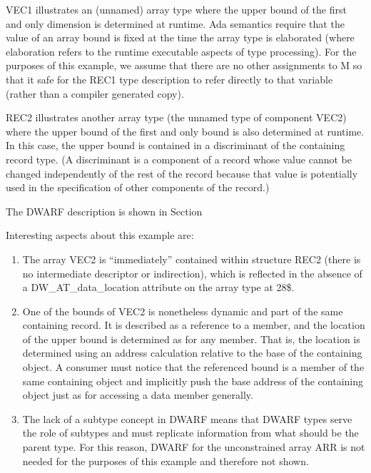 VEC1 illustrates an (unnamed) array type where the upper bound
of the first and only dimension is determined at runtime. Ada
semantics require that the value of an array bound is fixed at
the time the array type is elaborated (where elaboration refers
to the runtime executable aspects of type processing). For
the purposes of this example, we assume that there are no
other assignments to M so that it safe for the REC1 type
description to refer directly to that variable (rather than
a compiler generated copy).

REC2 illustrates another array type (the unnamed type of
component VEC2) where the upper bound of the first and only
bound is also determined at runtime. In this case, the upper
bound is contained in a discriminant of the containing record
type. (A discriminant is a component of a record whose value
cannot be changed independently of the rest of the record
because that value is potentially used in the specification
of other components of the record.)

The DWARF description is shown in 
Section 


Interesting aspects about this example are:

\begin{enumerate}[1)]
\item The array VEC2 is ``immediately'' contained within structure
REC2 (there is no intermediate descriptor or indirection),
which is reflected in the absence of a DW\_AT\_data\_location
attribute on the array type at 28\$.

\item One of the bounds of VEC2 is nonetheless dynamic and part of
the same containing record. It is described as a reference to
a member, and the location of the upper bound is determined
as for any member. That is, the location is determined using
an address calculation relative to the base of the containing
object.  A consumer must notice that the referenced bound is a
member of the same containing object and implicitly push the
base address of the containing object just as for accessing
a data member generally.

\item The lack of a subtype concept in DWARF means that DWARF types
serve the role of subtypes and must replicate information from
what should be the parent type. For this reason, DWARF for
the unconstrained array ARR is not needed for the purposes
of this example and therefore not shown.
\end{enumerate}

